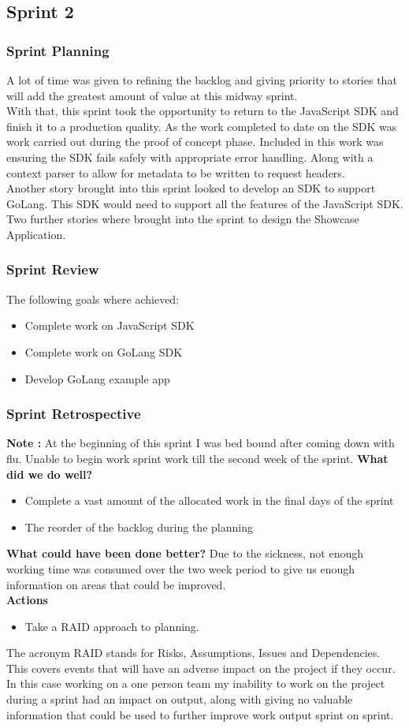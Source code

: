 \subsection{Sprint 2}
\subsubsection{Sprint Planning}
A lot of time was given to refining the backlog and giving priority to stories that will add the greatest amount of value at this midway sprint.
\\With that, this sprint took the opportunity to return to the JavaScript SDK and finish it to a production quality. As the work completed to date on the SDK was work carried out during the proof of concept phase. Included in this work was ensuring the SDK fails safely with appropriate error handling. Along with a context parser to allow for metadata to be written to request headers.
\\Another story brought into this sprint looked to develop an SDK to support GoLang. This SDK would need to support all the features of the JavaScript SDK.
\\Two further stories where brought into the sprint to design the Showcase Application.
\subsubsection{Sprint Review}
The following goals where achieved:
\begin{itemize}
    \item Complete work on JavaScript SDK
    \item Complete work on GoLang SDK
    \item Develop GoLang example app
\end{itemize}
\subsubsection{Sprint Retrospective}
\textbf{Note :} At the beginning of this sprint I was bed bound after coming down with flu. Unable to begin work sprint work till the second week of the sprint.
\textbf{What did we do well?}
\begin{itemize}
    \item Complete a vast amount of the allocated work in the final days of the sprint
    \item The reorder of the backlog during the planning
\end{itemize}
\textbf{What could have been done better?}
Due to the sickness, not enough working time was consumed over the two week period to give us enough information on areas that could be improved.
\\\textbf{Actions}
\begin{itemize}
    \item Take a RAID approach to planning.
\end{itemize}
The acronym RAID stands for Risks, Assumptions, Issues and Dependencies. This covers events that will have an adverse impact on the project if they occur. In this case working on a one person team my inability to work on the project during a sprint had an impact on output, along with giving no valuable information that could be used to further improve work output sprint on sprint.
